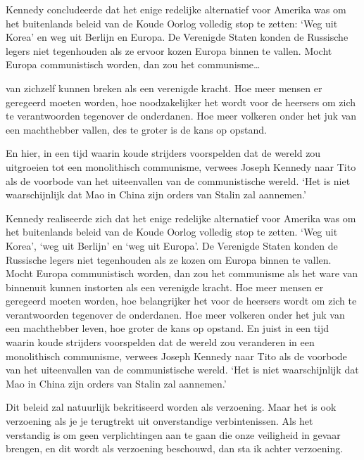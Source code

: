 \documentclass[
  a5paper,
  smalldemyvopaper,10pt,twoside,onecolumn,openright,extrafontsizes,hidelinks]{memoir}
\renewenvironment{quote}%
               {\list{}{\rightmargin=.6cm\leftmargin=.6cm}%
                \itshape \item[]}%
               {\endlist}
\begin{document}
Kennedy concludeerde dat het enige redelijke alternatief voor Amerika
was om het buitenlands beleid van de Koude Oorlog volledig stop te
zetten: `Weg uit Korea' en weg uit Berlijn en Europa. De Verenigde
Staten konden de Russische legers niet tegenhouden als ze ervoor kozen
Europa binnen te vallen. Mocht Europa communistisch worden, dan zou het
communisme\ldots{}

\begin{quote}
van zichzelf kunnen breken als een verenigde kracht. Hoe meer mensen er
geregeerd moeten worden, hoe noodzakelijker het wordt voor de heersers
om zich te verantwoorden tegenover de onderdanen. Hoe meer volkeren
onder het juk van een machthebber vallen, des te groter is de kans op
opstand.
\end{quote}

En hier, in een tijd waarin koude strijders voorspelden dat de wereld
zou uitgroeien tot een monolithisch communisme, verwees Joseph Kennedy
naar Tito als de voorbode van het uiteenvallen van de communistische
wereld. `Het is niet waarschijnlijk dat Mao in China zijn orders van
Stalin zal aannemen.'

\begin{quote}
Kennedy realiseerde zich dat het enige redelijke alternatief voor
Amerika was om het buitenlands beleid van de Koude Oorlog volledig stop
te zetten. `Weg uit Korea', `weg uit Berlijn' en `weg uit Europa'. De
Verenigde Staten konden de Russische legers niet tegenhouden als ze
kozen om Europa binnen te vallen. Mocht Europa communistisch worden, dan
zou het communisme als het ware van binnenuit kunnen instorten als een
verenigde kracht. Hoe meer mensen er geregeerd moeten worden, hoe
belangrijker het voor de heersers wordt om zich te verantwoorden
tegenover de onderdanen. Hoe meer volkeren onder het juk van een
machthebber leven, hoe groter de kans op opstand. En juist in een tijd
waarin koude strijders voorspelden dat de wereld zou veranderen in een
monolithisch communisme, verwees Joseph Kennedy naar Tito als de
voorbode van het uiteenvallen van de communistische wereld. `Het is niet
waarschijnlijk dat Mao in China zijn orders van Stalin zal aannemen.'

Dit beleid zal natuurlijk bekritiseerd worden als verzoening. Maar het
is ook verzoening als je je terugtrekt uit onverstandige verbintenissen.
Als het verstandig is om geen verplichtingen aan te gaan die onze
veiligheid in gevaar brengen, en dit wordt als verzoening beschouwd, dan
sta ik achter verzoening.
\end{quote}
\end{document}
